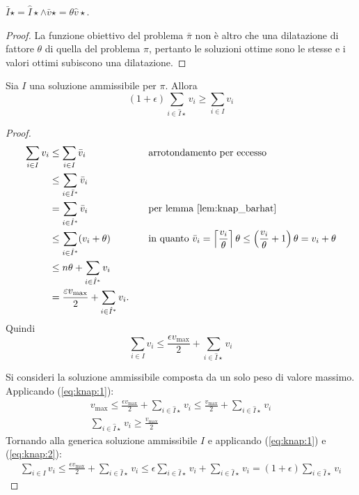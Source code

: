 \begin{lemma}\label{lem:knap_barhat}
	$\bar I\star = \hat I\star \land \bar v\star = \theta\hat v\star$.
\end{lemma}
\begin{proof}
	La funzione obiettivo del problema $\bar\pi$ non è altro che una dilatazione di fattore $\theta$ di quella del problema $\hat\pi$, pertanto le soluzioni ottime sono le stesse e i valori ottimi subiscono una dilatazione.
\end{proof}

\begin{lemma}
	Sia $I$ una soluzione ammissibile per $\pi$. Allora
	\begin{equation*}
		(1+\epsilon)\sum_{i\in\hat I\star} v_i \geq \sum_{i\in I} v_i
	\end{equation*}
\end{lemma}
\begin{proof}
	\begin{align*}
		\sum_{i\in I} v_i & \leq \sum_{i\in I} \bar v_i                                          &  & \quad \text{arrotondamento per eccesso}      \\
		                  & \leq \sum_{ i\in\bar I^*} \bar v_i                                                                                  \\
		                  & = \sum_{ i\in\hat I^*} \bar v_i                                   &  & \quad \text{per lemma \ref{lem:knap_barhat}} \\
		                  & \leq \sum_{i\in\hat I^*} (v_i+\theta)                             &  & \quad \text{in quanto
		$\bar v_i=\left\lceil \frac{v_i}{\theta} \right\rceil\theta\leq\left(\frac{v_i}{\theta}+1\right)\theta=v_i+\theta$}                                          \\
		                  & \leq n\theta+\sum_{i\in\hat I^*} v_i                                                                                \\
		                  & = \frac{\varepsilon v_{\max}}{2} + \sum_{i\in\hat I^*} v_i \text.
	\end{align*}
	Quindi
	\begin{equation}\label{eq:knap:1}
		\sum_{i\in I} v_i \leq \frac{\epsilon v_{\max}}{2} + \sum_{i\in\hat I\star} v_i
	\end{equation}

	\noindent Si consideri la soluzione ammissibile composta da un solo peso di valore massimo. Applicando (\ref{eq:knap:1}):
	\begin{gather}
		v_{\max} \leq \frac{\epsilon v_{\max}}{2} + \sum_{i\in\hat I\star} v_i \leq \frac{v_{\max}}{2} + \sum_{i\in\hat I\star} v_i \nonumber \\
		\sum_{i\in\hat I\star} v_i \geq \frac{v_{\max}}{2} \label{eq:knap:2}
	\end{gather}
	Tornando alla generica soluzione ammissibile $I$ e applicando (\ref{eq:knap:1}) e (\ref{eq:knap:2}):
	\begin{gather*}
		\sum_{i\in I} v_i \leq \frac{\epsilon v_{\max}}{2} + \sum_{i\in\hat I\star} v_i
		\leq \epsilon\sum_{i\in\hat I\star} v_i + \sum_{i\in\hat I\star} v_i = (1+\epsilon)\sum_{i\in\hat I\star} v_i
	\end{gather*}
\end{proof}
